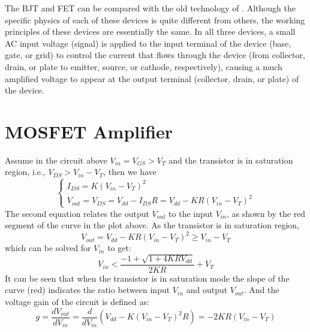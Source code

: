 The BJT and FET can be compared with the old technology of 
.
Although the specific physics of each of these devices is quite different 
from others, the working principles of these devices are essentially the 
same. In all three devices, a small AC input voltage (signal) is applied
to the input terminal of the device (base, gate, or grid) to control the
current that flows through the device (from collector, drain, or plate to 
emitter, source, or cathode, respectively), causing a much amplified voltage
to appear at the output terminal (collector, drain, or plate) of the device.


\section{MOSFET Amplifier}


Assume in the circuit above $V_{in}=V_{GS}>V_T$ and the transistor is in 
saturation region, i.e., $V_{DS}>V_{in}-V_T$, then we have 
\[ \left\{ \begin{array}{l}
I_{DS}=K(V_{in}-V_T)^2 \\
V_{out}=V_{DS}=V_{dd}-I_{DS} R=V_{dd}-KR(V_{in}-V_T)^2  \end{array} \right.
\]
The second equation relates the output $V_{out}$ to the input $V_{in}$, as
shown by the red segment of the curve in the plot above. As the transistor is 
in saturation region,
\[ V_{out}=V_{dd}-KR(V_{in}-V_T)^2\ge V_{in}-V_T \]
which can be solved for $V_{in}$ to get:
\[ V_{in}<\frac{-1+\sqrt{1+4KRV_{dd}}}{2KR}+V_T \]
It can be seen that when the transistor is in saturation mode the slope of 
the curve (red) indicates the ratio between input $V_{in}$ and output $V_{out}$.
And the voltage gain of the circuit is defined as:
\[ g=\frac{d V_{out}}{d V_{in}}=\frac{d}{d V_{in}}(V_{dd}-K(V_{in}-V_T)^2 R)
  =-2KR(V_{in}-V_T) \]

